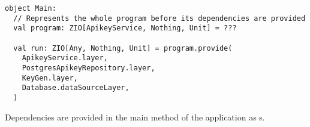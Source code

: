 \begin{algorithm}

\begin{verbatim}
object Main:
  // Represents the whole program before its dependencies are provided
  val program: ZIO[ApikeyService, Nothing, Unit] = ???

  val run: ZIO[Any, Nothing, Unit] = program.provide(
    ApikeyService.layer,
    PostgresApikeyRepository.layer,
    KeyGen.layer,
    Database.dataSourceLayer,
  )
\end{verbatim}

\caption{Dependencies are provided in the main method of the application as s. \label{casestudy:dependencyinjection}}
\end{algorithm}